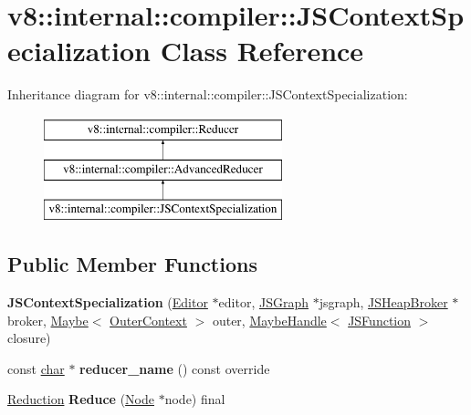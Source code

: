 \hypertarget{classv8_1_1internal_1_1compiler_1_1JSContextSpecialization}{}\section{v8\+:\+:internal\+:\+:compiler\+:\+:J\+S\+Context\+Specialization Class Reference}
\label{classv8_1_1internal_1_1compiler_1_1JSContextSpecialization}
Inheritance diagram for v8\+:\+:internal\+:\+:compiler\+:\+:J\+S\+Context\+Specialization\+:\begin{figure}[H]
\begin{center}
\leavevmode
\includegraphics[height=3.000000cm]{classv8_1_1internal_1_1compiler_1_1JSContextSpecialization}
\end{center}
\end{figure}
\subsection*{Public Member Functions}
\begin{DoxyCompactItemize}
\item 
\mbox{\label{classv8_1_1internal_1_1compiler_1_1JSContextSpecialization_a993a6ea82565f6813442d032ce532569}} 
{\bfseries J\+S\+Context\+Specialization} (\mbox{\hyperlink{classv8_1_1internal_1_1compiler_1_1AdvancedReducer_1_1Editor}{Editor}} $\ast$editor, \mbox{\hyperlink{classv8_1_1internal_1_1compiler_1_1JSGraph}{J\+S\+Graph}} $\ast$jsgraph, \mbox{\hyperlink{classv8_1_1internal_1_1compiler_1_1JSHeapBroker}{J\+S\+Heap\+Broker}} $\ast$broker, \mbox{\hyperlink{classv8_1_1Maybe}{Maybe}}$<$ \mbox{\hyperlink{structv8_1_1internal_1_1compiler_1_1OuterContext}{Outer\+Context}} $>$ outer, \mbox{\hyperlink{classv8_1_1internal_1_1MaybeHandle}{Maybe\+Handle}}$<$ \mbox{\hyperlink{classv8_1_1internal_1_1JSFunction}{J\+S\+Function}} $>$ closure)
\item 
\mbox{\label{classv8_1_1internal_1_1compiler_1_1JSContextSpecialization_ab9dfd7f4f01ad9ba75e61f447fda58c2}} 
const \mbox{\hyperlink{classchar}{char}} $\ast$ {\bfseries reducer\+\_\+name} () const override
\item 
\mbox{\label{classv8_1_1internal_1_1compiler_1_1JSContextSpecialization_a85165ee6b4f17c82b3f21c8f282ae82b}} 
\mbox{\hyperlink{classv8_1_1internal_1_1compiler_1_1Reduction}{Reduction}} {\bfseries Reduce} (\mbox{\hyperlink{classv8_1_1internal_1_1compiler_1_1Node}{Node}} $\ast$node) final
\end{DoxyCompactItemize}
